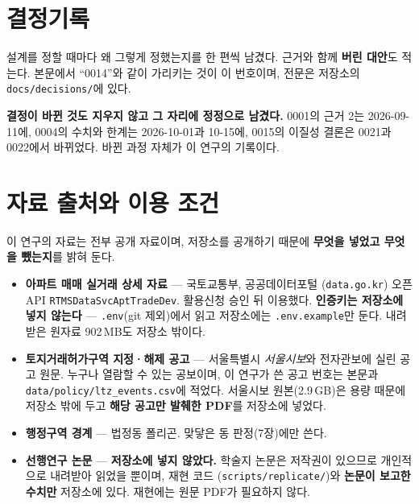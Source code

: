 
\section{결정기록}

설계를 정할 때마다 왜 그렇게 정했는지를 한 편씩 남겼다. 근거와 함께
\textbf{버린 대안}도 적는다. 본문에서 ``0014''와 같이 가리키는 것이 이 번호이며,
전문은 저장소의 \texttt{docs/decisions/}에 있다.



\textbf{결정이 바뀐 것도 지우지 않고 그 자리에 정정으로 남겼다.} 0001의 근거 2는
2026-09-11에, 0004의 수치와 한계는 2026-10-01과 10-15에, 0015의 이질성 결론은
0021과 0022에서 바뀌었다. 바뀐 과정 자체가 이 연구의 기록이다.

\section{자료 출처와 이용 조건}

이 연구의 자료는 전부 공개 자료이며, 저장소를 공개하기 때문에 \textbf{무엇을
넣었고 무엇을 뺐는지}를 밝혀 둔다.

\begin{itemize}[leftmargin=2em, itemsep=3pt]
  \item \textbf{아파트 매매 실거래 상세 자료} --- 국토교통부, 공공데이터포털
        (\texttt{data.go.kr}) 오픈 API \texttt{RTMSDataSvcAptTradeDev}.
        활용신청 승인 뒤 이용했다. \textbf{인증키는 저장소에 넣지 않는다} ---
        \texttt{.env}(git 제외)에서 읽고 저장소에는 \texttt{.env.example}만 둔다.
        내려받은 원자료 902\,MB도 저장소 밖이다.
  \item \textbf{토지거래허가구역 지정·해제 공고} --- 서울특별시 \emph{서울시보}와
        전자관보에 실린 공고 원문. 누구나 열람할 수 있는 공보이며, 이 연구가 쓴
        공고 번호는 본문과 \texttt{data/policy/ltz\_events.csv}에 적었다.
        서울시보 원본(2.9\,GB)은 용량 때문에 저장소 밖에 두고 \textbf{해당
        공고만 발췌한 PDF}를 저장소에 넣었다.
  \item \textbf{행정구역 경계} --- 법정동 폴리곤. 맞닿은 동 판정(7장)에만 쓴다.
  \item \textbf{선행연구 논문} --- \textbf{저장소에 넣지 않았다.} 학술지 논문은
        저작권이 있으므로 개인적으로 내려받아 읽었을 뿐이며, 재현 코드
        (\texttt{scripts/replicate/})와 \textbf{논문이 보고한 수치만} 저장소에
        있다. 재현에는 원문 PDF가 필요하지 않다.
\end{itemize}

